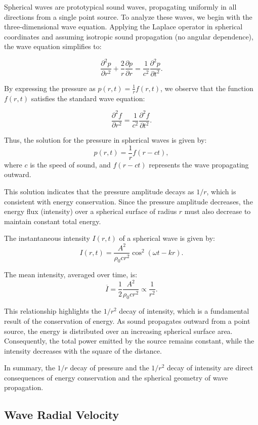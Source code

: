 \documentclass[a4paper]{article}
\begin{document}
Spherical waves are prototypical sound waves, propagating uniformly in all directions from a single point source. To analyze these waves, we begin with the three-dimensional wave equation. Applying the Laplace operator in spherical coordinates and assuming isotropic sound propagation (no angular dependence), the wave equation simplifies to:

\[
\frac{\partial^2 p}{\partial r^2} + \frac{2}{r} \frac{\partial p}{\partial r} = \frac{1}{c^2} \frac{\partial^2 p}{\partial t^2}.
\]

By expressing the pressure as \( p(r, t) = \frac{1}{r} f(r, t) \), we observe that the function \( f(r, t) \) satisfies the standard wave equation:

\[
\frac{\partial^2 f}{\partial r^2} = \frac{1}{c^2} \frac{\partial^2 f}{\partial t^2}.
\]

Thus, the solution for the pressure in spherical waves is given by:
\[
p(r, t) = \frac{1}{r} f(r - ct),
\]
where \( c \) is the speed of sound, and \( f(r - ct) \) represents the wave propagating outward.



This solution indicates that the pressure amplitude decays as \( 1/r \), which is consistent with energy conservation. Since the pressure amplitude decreases, the energy flux (intensity) over a spherical surface of radius \( r \) must also decrease to maintain constant total energy.

The instantaneous intensity \( I(r, t) \) of a spherical wave is given by:
\[
I(r, t) = \frac{A^2}{\rho_0 c r^2} \cos^2(\omega t - kr).
\]

The mean intensity, averaged over time, is:
\[
\overline{I} = \frac{1}{2} \frac{A^2}{\rho_0 c r^2} \propto \frac{1}{r^2}.
\]

This relationship highlights the \( 1/r^2 \) decay of intensity, which is a fundamental result of the conservation of energy. As sound propagates outward from a point source, the energy is distributed over an increasing spherical surface area. Consequently, the total power emitted by the source remains constant, while the intensity decreases with the square of the distance.



In summary, the \( 1/r \) decay of pressure and the \( 1/r^2 \) decay of intensity are direct consequences of energy conservation and the spherical geometry of wave propagation. \\


\subsection{Wave Radial Velocity}
\end{document}
